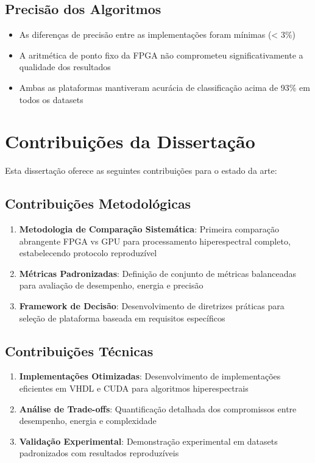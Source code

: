 \subsection{Precisão dos Algoritmos}
\begin{itemize}
    \item As diferenças de precisão entre as implementações foram mínimas (< 3\%)
    \item A aritmética de ponto fixo da FPGA não comprometeu significativamente a qualidade dos resultados
    \item Ambas as plataformas mantiveram acurácia de classificação acima de 93\% em todos os datasets
\end{itemize}

\section{Contribuições da Dissertação}\label{sec:contribuicoes_finais}

Esta dissertação oferece as seguintes contribuições para o estado da arte:

\subsection{Contribuições Metodológicas}
\begin{enumerate}
    \item \textbf{Metodologia de Comparação Sistemática}: Primeira comparação abrangente FPGA vs GPU para processamento hiperespectral completo, estabelecendo protocolo reproduzível
    \item \textbf{Métricas Padronizadas}: Definição de conjunto de métricas balanceadas para avaliação de desempenho, energia e precisão
    \item \textbf{Framework de Decisão}: Desenvolvimento de diretrizes práticas para seleção de plataforma baseada em requisitos específicos
\end{enumerate}

\subsection{Contribuições Técnicas}
\begin{enumerate}
    \item \textbf{Implementações Otimizadas}: Desenvolvimento de implementações eficientes em VHDL e CUDA para algoritmos hiperespectrais
    \item \textbf{Análise de Trade-offs}: Quantificação detalhada dos compromissos entre desempenho, energia e complexidade
    \item \textbf{Validação Experimental}: Demonstração experimental em datasets padronizados com resultados reproduzíveis
\end{enumerate}

